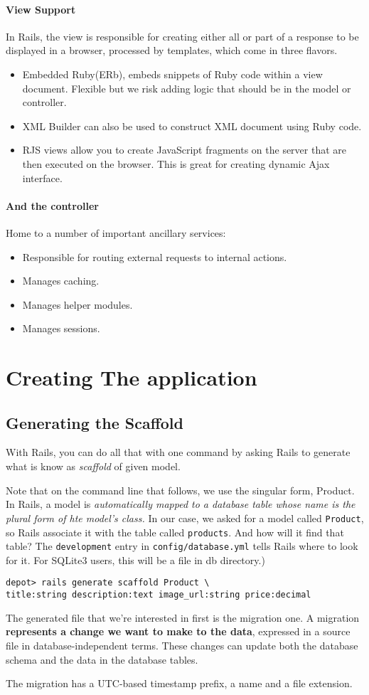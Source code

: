 \documentclass[11pt, a4paper]{book}
\begin{document}
\subsubsection{View Support}
In Rails, the view is responsible for creating either all or part of a response
to be displayed in a browser, processed by templates, which come in three
flavors.

\begin{itemize}
\item Embedded Ruby(ERb), embeds snippets of Ruby code within a view document.
Flexible but we risk adding logic that should be in the model or controller.
\item XML Builder can also be used to construct XML document using Ruby code.
\item RJS views allow you to create JavaScript fragments on the server that are
then executed on the browser. This is great for creating dynamic Ajax interface.
\end{itemize}

\subsubsection{And the controller}
Home to a number of important ancillary services:
\begin{itemize}
\item Responsible for routing external requests to internal actions.
\item Manages caching.
\item Manages helper modules.
\item Manages sessions.
\end{itemize}

\chapter{Creating The application}
\section{Generating the Scaffold}
With Rails, you can do all that with one command by asking Rails to generate
what is know as \emph{scaffold} of given model.

Note that on the command line that follows, we use the singular form, Product.
In Rails, a model is \emph{automatically mapped to a database table whose name
is the plural form of hte model's class.} In our case, we asked for a model
called \verb|Product|, so Rails associate it with the table called
\verb|products|. And how will it find that table? The \verb|development| entry
in \verb|config/database.yml| tells Rails where to look for it. For SQLite3
users, this will be a file in db directory.)
\begin{verbatim}
depot> rails generate scaffold Product \
title:string description:text image_url:string price:decimal
\end{verbatim}
The generated file that we're interested in first is the migration one. A
migration \textbf{represents a change we want to make to the data}, expressed
in a source file in database-independent terms. These changes can update both
the database schema and the data in the database tables.

The migration has a UTC-based timestamp prefix, a name and a file extension.
\end{document}
